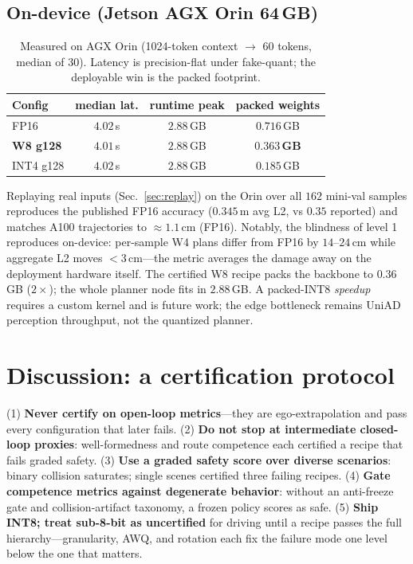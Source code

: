 \documentclass[conference]{IEEEtran}
\begin{document}
\subsection{On-device (Jetson AGX Orin 64\,GB)}
\label{sec:orin}
\begin{table}[t]\centering
\caption{Measured on AGX Orin (1024-token context $\to$ 60 tokens, median of 30). Latency is
precision-flat under fake-quant; the deployable win is the packed footprint.}
\label{tab:orinsys}
\begin{tabular}{lccc}
\toprule
Config & median lat. & runtime peak & packed weights \\
\midrule
FP16       & $4.02$\,s & $2.88$\,GB & $0.716$\,GB \\
\textbf{W8 g128} & $4.01$\,s & $2.88$\,GB & \textbf{$0.363$\,GB} \\
INT4 g128  & $4.02$\,s & $2.88$\,GB & $0.185$\,GB \\
\bottomrule
\end{tabular}
\end{table}
Replaying real inputs (Sec.~\ref{sec:replay}) on the Orin over all $162$ mini-val samples
reproduces the published FP16 accuracy ($0.345$\,m avg L2, vs $0.35$ reported) and matches
A100 trajectories to $\approx1.1$\,cm (FP16). Notably, the blindness of level 1 reproduces
on-device: per-sample W4 plans differ from FP16 by $14$--$24$\,cm while aggregate L2 moves
$<3$\,cm---the metric averages the damage away on the deployment hardware itself. The
certified W8 recipe packs the backbone to $0.36$\,GB ($2\times$); the whole planner node fits
in $2.88$\,GB. A packed-INT8 \emph{speedup} requires a custom kernel and is future work; the
edge bottleneck remains UniAD perception throughput, not the quantized planner.

\section{Discussion: a certification protocol}
(1) \textbf{Never certify on open-loop metrics}---they are ego-extrapolation and pass every
configuration that later fails. (2) \textbf{Do not stop at intermediate closed-loop
proxies}: well-formedness and route competence each certified a recipe that fails graded
safety. (3) \textbf{Use a graded safety score over diverse scenarios}: binary collision
saturates; single scenes certified three failing recipes. (4) \textbf{Gate competence
metrics against degenerate behavior}: without an anti-freeze gate and collision-artifact
taxonomy, a frozen policy scores as safe. (5) \textbf{Ship INT8; treat sub-8-bit as
uncertified} for driving until a recipe passes the full hierarchy---granularity, AWQ, and
rotation each fix the failure mode one level below the one that matters.
\end{document}
